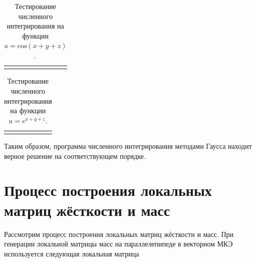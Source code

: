 \begin{table}
	\caption{Тестирование численного интегрирования на функции $u = \text{cos}(x + y + z)$.}
	\centering
	\small
	\begin{tabularx}{1.0\textwidth}{| >{\raggedright\arraybackslash}X | >{\raggedright\arraybackslash}X | >{\raggedright\arraybackslash}X |>{\raggedright\arraybackslash}X |>{\raggedright\arraybackslash}X |}
		\hline
		\centering{Аналитический результат} & \centering{Гаусс 2} & \centering{Гаусс 3} & \centering{Гаусс 4} & \centering{Гаусс 5} \tabularnewline \hline
		
		\centering{4.7666...} & \centering{4.7063579e+00}& \centering{4.7671091e+00} & \centering{4.7665835e+00} & \centering{4.7665859e+00} \tabularnewline \hline
		
	\end{tabularx}
	\label{tab:numIntegr6}
\end{table}

\begin{table}
	\caption{Тестирование численного интегрирования на функции $u = e^{x + y + z}$.}
	\centering
	\small
	\begin{tabularx}{1.0\textwidth}{| >{\raggedright\arraybackslash}X | >{\raggedright\arraybackslash}X | >{\raggedright\arraybackslash}X |>{\raggedright\arraybackslash}X |>{\raggedright\arraybackslash}X |}
		\hline
		\centering{Аналитический результат} & \centering{Гаусс 2} & \centering{Гаусс 3} & \centering{Гаусс 4} & \centering{Гаусс 5} \tabularnewline \hline
		
		\centering{12.9845...} & \centering{1.2857243e+01}& \centering{1.2983458e+01} & \centering{1.2984538e+01} & \centering{1.2984543e+01} \tabularnewline \hline
		
	\end{tabularx}
	\label{tab:numIntegr7}
\end{table}



Таким образом, программа численного интегрирования методами Гаусса находит верное решение на соответствующем порядке.

\section{Процесс построения локальных матриц жёсткости и масс}

Рассмотрим процесс построения локальных матриц жёсткости и масс. При генерации локальной матрицы масс на параллелепипеде в векторном МКЭ используется следующая локальная матрица

